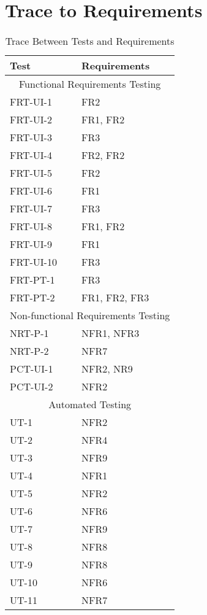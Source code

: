 \documentclass[12pt, titlepage]{article}
\begin{document}
\section{Trace to Requirements}
\label{trace:req}
\begin{table}[H]
			\begin{tabularx}{\textwidth}{XX}
				\toprule
				Test & Requirements \\
				\midrule
				\multicolumn{2}{c}{Functional Requirements Testing} \\
				\midrule
				FRT-UI-1 & FR2 \\
				FRT-UI-2 & FR1, FR2 \\
				FRT-UI-3 & FR3 \\
				FRT-UI-4 & FR2, FR2 \\
				FRT-UI-5 & FR2 \\
				FRT-UI-6 & FR1 \\
				FRT-UI-7 & FR3 \\
				FRT-UI-8 & FR1, FR2 \\
				FRT-UI-9 & FR1 \\
				FRT-UI-10 & FR3 \\
				FRT-PT-1 & FR3 \\
				FRT-PT-2 & FR1, FR2, FR3 \\
				\midrule
				\multicolumn{2}{c}{Non-functional Requirements Testing} \\
				\midrule
				NRT-P-1 & NFR1, NFR3 \\
				NRT-P-2 & NFR7 \\
				PCT-UI-1 & NFR2, NR9 \\
				PCT-UI-2 & NFR2 \\
				\midrule
				\multicolumn{2}{c}{Automated Testing} \\
				\midrule
				UT-1 & NFR2 \\
				UT-2 & NFR4 \\
				UT-3 & NFR9 \\
				UT-4 & NFR1 \\
				UT-5 & NFR2 \\
				UT-6 & NFR6 \\
				UT-7 & NFR9 \\
				UT-8 & NFR8 \\
				UT-9 & NFR8 \\
				UT-10 & NFR6 \\
				UT-11 & NFR7 \\
				\bottomrule
			\end{tabularx}

			\caption{Trace Between Tests and Requirements}
			\label{Table}
		\end{table}
\end{document}
